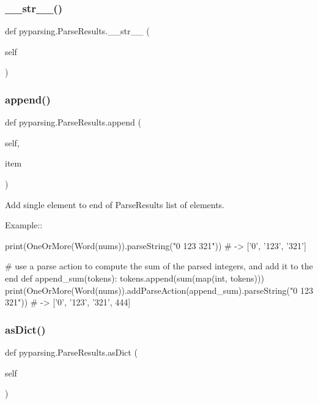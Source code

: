 \subsubsection{\texorpdfstring{\+\_\+\+\_\+str\+\_\+\+\_\+()}{\_\_str\_\_()}}
{\footnotesize\ttfamily def pyparsing.\+Parse\+Results.\+\_\+\+\_\+str\+\_\+\+\_\+ (\begin{DoxyParamCaption}\item[{}]{self }\end{DoxyParamCaption})}

\mbox{\label{classpyparsing_1_1ParseResults_a0cfa84dbce75b7250ee46fb10cd77b60}} 
\subsubsection{\texorpdfstring{append()}{append()}}
{\footnotesize\ttfamily def pyparsing.\+Parse\+Results.\+append (\begin{DoxyParamCaption}\item[{}]{self,  }\item[{}]{item }\end{DoxyParamCaption})}

\begin{DoxyVerb}Add single element to end of ParseResults list of elements.

Example::

    print(OneOrMore(Word(nums)).parseString("0 123 321")) # -> ['0', '123', '321']

    # use a parse action to compute the sum of the parsed integers, and add it to the end
    def append_sum(tokens):
tokens.append(sum(map(int, tokens)))
    print(OneOrMore(Word(nums)).addParseAction(append_sum).parseString("0 123 321")) # -> ['0', '123', '321', 444]
\end{DoxyVerb}
 \mbox{\label{classpyparsing_1_1ParseResults_a43d8bf5fe92801093dc5aaf6b4236937}} 
\subsubsection{\texorpdfstring{as\+Dict()}{asDict()}}
{\footnotesize\ttfamily def pyparsing.\+Parse\+Results.\+as\+Dict (\begin{DoxyParamCaption}\item[{}]{self }\end{DoxyParamCaption})}

